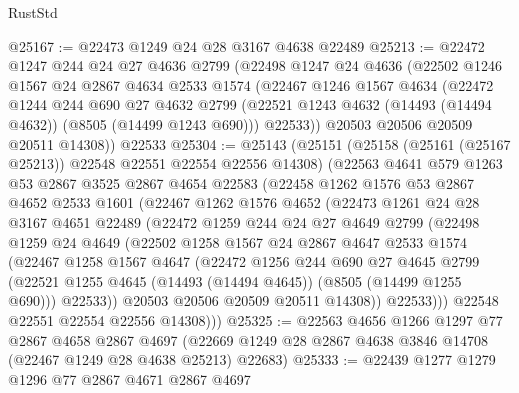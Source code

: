 \begin{lexlean}{RustStd}
\begin{coremodule}
@25167 := @22473 @1249 @24 @28 @3167 @4638 @22489
@25213 := @22472
    @1247
    @244
    @24
    @27
    @4636
    @2799
    (@22498
      @1247
      @24
      @4636
      (@22502
        @1246
        @1567
        @24
        @2867
        @4634
        @2533
        @1574
        (@22467
          @1246
          @1567
          @4634
          (@22472
            @1244
            @244
            @690
            @27
            @4632
            @2799
            (@22521 @1243 @4632 (@14493 (@14494 @4632)) (@8505 (@14499 @1243 @690)))
            @22533))
        @20503
        @20506
        @20509
        @20511
        @14308))
    @22533
@25304 := @25143
    (@25151
      (@25158 (@25161 (@25167 @25213)) @22548 @22551 @22554 @22556 @14308)
      (@22563
        @4641
        @579
        @1263
        @53
        @2867
        @3525
        @2867
        @4654
        @22583
        (@22458
          @1262
          @1576
          @53
          @2867
          @4652
          @2533
          @1601
          (@22467
            @1262
            @1576
            @4652
            (@22473
              @1261
              @24
              @28
              @3167
              @4651
              @22489
              (@22472
                @1259
                @244
                @24
                @27
                @4649
                @2799
                (@22498
                  @1259
                  @24
                  @4649
                  (@22502
                    @1258
                    @1567
                    @24
                    @2867
                    @4647
                    @2533
                    @1574
                    (@22467
                      @1258
                      @1567
                      @4647
                      (@22472
                        @1256
                        @244
                        @690
                        @27
                        @4645
                        @2799
                        (@22521 @1255 @4645 (@14493 (@14494 @4645)) (@8505 (@14499 @1255 @690)))
                        @22533))
                    @20503
                    @20506
                    @20509
                    @20511
                    @14308))
                @22533)))
          @22548
          @22551
          @22554
          @22556
          @14308)))
@25325 := @22563
    @4656
    @1266
    @1297
    @77
    @2867
    @4658
    @2867
    @4697
    (@22669 @1249 @28 @2867 @4638 @3846 @14708 (@22467 @1249 @28 @4638 @25213) @22683)
@25333 := @22439 @1277 @1279 @1296 @77 @2867 @4671 @2867 @4697

\end{coremodule}
\end{lexlean}
